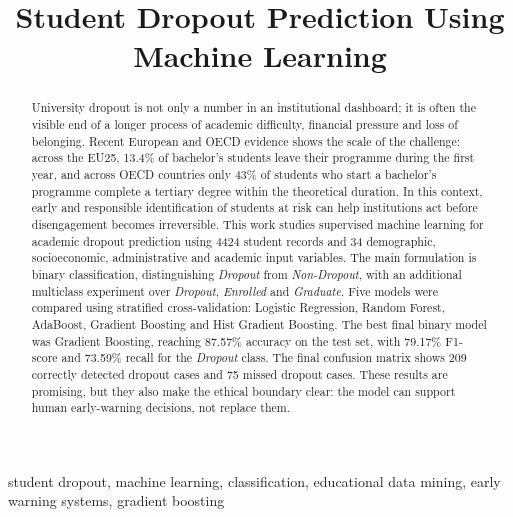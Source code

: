 \documentclass[conference]{IEEEtran}
\title{Student Dropout Prediction Using Machine Learning}
\author{
\IEEEauthorblockN{Henrique Reveles, n.\textordmasculine{} 119786\\
Gonçalo Simões, n.\textordmasculine{} 119412\\
Geovanni Santos, n.\textordmasculine{} 115637}
\IEEEauthorblockA{
Introdução à Aprendizagem Automática\\
Universidade de Aveiro}
}
\begin{document}
\maketitle

\begin{abstract}
University dropout is not only a number in an institutional dashboard; it is often the visible end of a longer process of academic difficulty, financial pressure and loss of belonging. Recent European and OECD evidence shows the scale of the challenge: across the EU25, 13.4\% of bachelor's students leave their programme during the first year, and across OECD countries only 43\% of students who start a bachelor's programme complete a tertiary degree within the theoretical duration. In this context, early and responsible identification of students at risk can help institutions act before disengagement becomes irreversible. This work studies supervised machine learning for academic dropout prediction using 4424 student records and 34 demographic, socioeconomic, administrative and academic input variables. The main formulation is binary classification, distinguishing \textit{Dropout} from \textit{Non-Dropout}, with an additional multiclass experiment over \textit{Dropout}, \textit{Enrolled} and \textit{Graduate}. Five models were compared using stratified cross-validation: Logistic Regression, Random Forest, AdaBoost, Gradient Boosting and Hist Gradient Boosting. The best final binary model was Gradient Boosting, reaching 87.57\% accuracy on the test set, with 79.17\% F1-score and 73.59\% recall for the \textit{Dropout} class. The final confusion matrix shows 209 correctly detected dropout cases and 75 missed dropout cases. These results are promising, but they also make the ethical boundary clear: the model can support human early-warning decisions, not replace them.
\end{abstract}

\begin{IEEEkeywords}
student dropout, machine learning, classification, educational data mining, early warning systems, gradient boosting
\end{IEEEkeywords}
\end{document}
